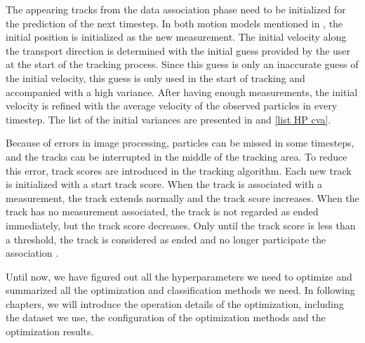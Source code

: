 The appearing tracks from the data association phase need to be initialized for the prediction of the next timestep. In both motion models mentioned in , the initial position is initialized as the new measurement. The initial velocity along the transport direction is determined with the initial guess provided by the user at the start of the tracking process. Since this guess is only an inaccurate guess of the initial velocity, this guess is only used in the start of tracking and accompanied with a high variance. After having enough measurements, the initial velocity is refined with the average velocity of the observed particles in every timestep. The list of the initial variances are presented in  and \ref{list HP cva}. 

Because of errors in image processing, particles can be missed in some timesteps, and the tracks can be interrupted in the middle of the tracking area. To reduce this error, track scores are introduced in the tracking algorithm. Each new track is initialized with a start track score. When the track is associated with a measurement, the track extends normally and the track score increases. When the track has no measurement associated, the track is not regarded as ended immediately, but the track score decreases. Only until the track score is less than a threshold, the track is considered as ended and no longer participate the association .

Until now, we have figured out all the hyperparameters we need to optimize and summarized all the optimization and classification methods we need. In following chapters, we will introduce the operation details of the optimization, including the dataset we use, the configuration of the optimization methods and the optimization results.





























